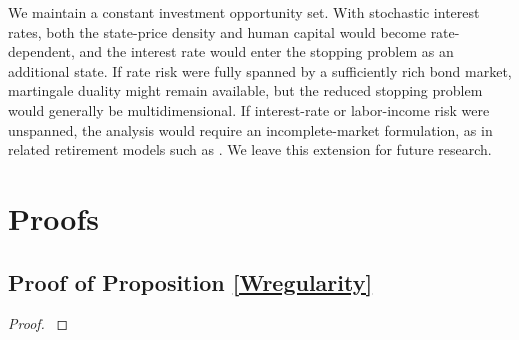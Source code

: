 \documentclass[a4paper,11pt]{amsart}
\numberwithin{equation}{section}
\newcommand{\blue}[1]{{\color{black}#1}}
\begin{document}
{\blue{We maintain a constant investment opportunity set. With stochastic interest rates, both the state-price density and human capital would become rate-dependent, and the interest rate would enter the stopping problem as an additional state. If rate risk were fully spanned by a sufficiently rich bond market, martingale duality might remain available, but the reduced stopping problem would generally be multidimensional. If interest-rate or labor-income risk were unspanned, the analysis would require an incomplete-market formulation, as in related retirement models such as \citet{bensoussan2016unemployment}.  We leave this extension for future research.}

\appendix
\setcounter{subsection}{0}
\renewcommand\thesubsection{A.\arabic{subsection}}
\setcounter{equation}{0}
\renewcommand\theequation{A.\arabic{equation}}
\setcounter{lemma}{0}
    \renewcommand{\thelemma}{\Alph{section}.\arabic{lemma}}
    
       
    
    
    
    
    
\section{Proofs}
\renewcommand\theequation{A.\arabic{equation}}
\renewcommand\thesubsection{A.\arabic{subsection}}


\subsection{Proof of Proposition \ref{Wregularity}}
\begin{proof}\label{proW}


\end{proof}}
\end{document}
